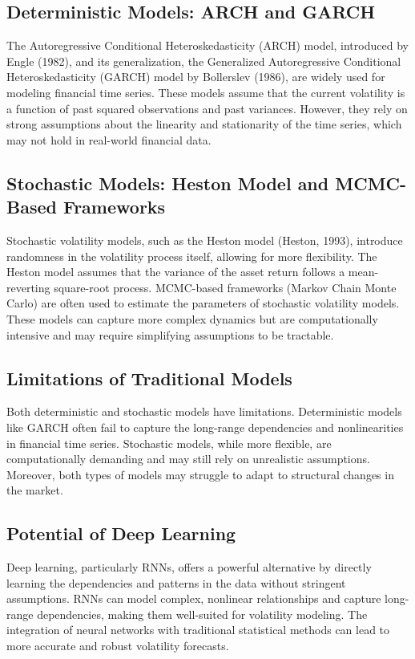 \documentclass[letterpaper, 11pt]{article}
\begin{document}
\subsection{Deterministic Models: ARCH and GARCH}
The Autoregressive Conditional Heteroskedasticity (ARCH) model, introduced by Engle (1982), and its generalization, the Generalized Autoregressive Conditional Heteroskedasticity (GARCH) model by Bollerslev (1986), are widely used for modeling financial time series. These models assume that the current volatility is a function of past squared observations and past variances. However, they rely on strong assumptions about the linearity and stationarity of the time series, which may not hold in real-world financial data.

\subsection{Stochastic Models: Heston Model and MCMC-Based Frameworks}
Stochastic volatility models, such as the Heston model (Heston, 1993), introduce randomness in the volatility process itself, allowing for more flexibility. The Heston model assumes that the variance of the asset return follows a mean-reverting square-root process. MCMC-based frameworks (Markov Chain Monte Carlo) are often used to estimate the parameters of stochastic volatility models. These models can capture more complex dynamics but are computationally intensive and may require simplifying assumptions to be tractable.

\subsection{Limitations of Traditional Models}
Both deterministic and stochastic models have limitations. Deterministic models like GARCH often fail to capture the long-range dependencies and nonlinearities in financial time series. Stochastic models, while more flexible, are computationally demanding and may still rely on unrealistic assumptions. Moreover, both types of models may struggle to adapt to structural changes in the market.

\subsection{Potential of Deep Learning}
Deep learning, particularly RNNs, offers a powerful alternative by directly learning the dependencies and patterns in the data without stringent assumptions. RNNs can model complex, nonlinear relationships and capture long-range dependencies, making them well-suited for volatility modeling. The integration of neural networks with traditional statistical methods can lead to more accurate and robust volatility forecasts.
\end{document}
